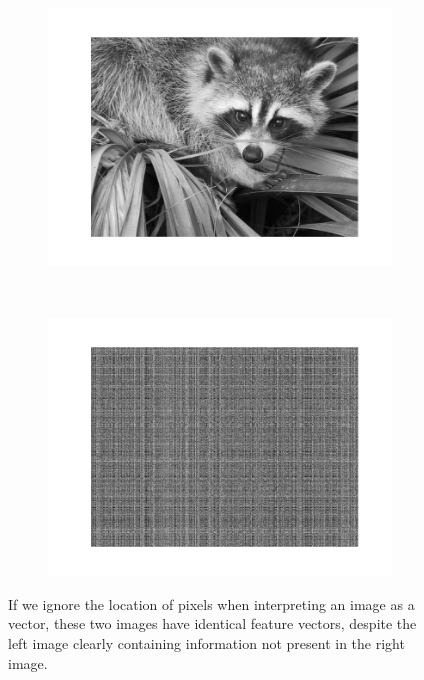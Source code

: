         \begin{figure}[!ht]
            \centering
            \begin{subfigure}[t]{0.5\textwidth}
                \centering
                \includegraphics[width=\textwidth]{images/face.png}
            \end{subfigure}%
            ~
            \begin{subfigure}[t]{0.5\textwidth}
                \centering
                \includegraphics[width=\textwidth]{images/face_shuffled.png}
            \end{subfigure}
            \caption{If we ignore the location of pixels when interpreting an
                image as a vector, these two images have identical feature
                vectors, despite the left image clearly containing information
                not present in the right image.}
            \label{fig:shuffled-face}
        \end{figure}

